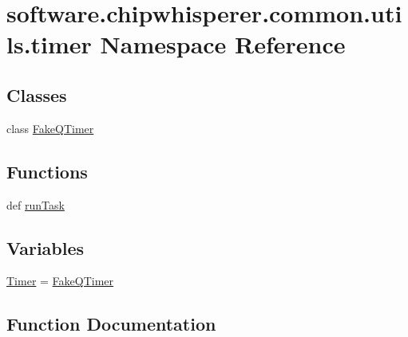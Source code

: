 \hypertarget{namespacesoftware_1_1chipwhisperer_1_1common_1_1utils_1_1timer}{}\section{software.\+chipwhisperer.\+common.\+utils.\+timer Namespace Reference}
\label{namespacesoftware_1_1chipwhisperer_1_1common_1_1utils_1_1timer}
\subsection*{Classes}
\begin{DoxyCompactItemize}
\item 
class \hyperlink{classsoftware_1_1chipwhisperer_1_1common_1_1utils_1_1timer_1_1FakeQTimer}{Fake\+Q\+Timer}
\end{DoxyCompactItemize}
\subsection*{Functions}
\begin{DoxyCompactItemize}
\item 
def \hyperlink{namespacesoftware_1_1chipwhisperer_1_1common_1_1utils_1_1timer_a5bc9a91bcf02a8990381ded4d9ca7872}{run\+Task}
\end{DoxyCompactItemize}
\subsection*{Variables}
\begin{DoxyCompactItemize}
\item 
\hyperlink{namespacesoftware_1_1chipwhisperer_1_1common_1_1utils_1_1timer_aa4c1e5572f5ed6511d6902a02ad05d06}{Timer} = \hyperlink{classsoftware_1_1chipwhisperer_1_1common_1_1utils_1_1timer_1_1FakeQTimer}{Fake\+Q\+Timer}
\end{DoxyCompactItemize}


\subsection{Function Documentation}
\hypertarget{namespacesoftware_1_1chipwhisperer_1_1common_1_1utils_1_1timer_a5bc9a91bcf02a8990381ded4d9ca7872}{}
